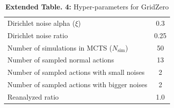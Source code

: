 \begin{table}[h]
\begin{center}
\begin{small}
{\begin{tabular}{lc}
Dirichlet noise alpha ($\xi$) & 0.3 \\
Dirichlet noise ratio & 0.25 \\
Number of simulations in MCTS ($N_{\text{sim}}$) & 50 \\
Number of sampled normal actions & 13 \\
Number of sampled actions with small noises & 2 \\
Number of sampled actions with bigger noises & 2 \\
Reanalyzed ratio & 1.0 \\
\bottomrule
\end{tabular}
}
\end{small}
\end{center}
\captionsetup{labelformat=empty}
    \caption{\textbf{Extended Table. 4:} Hyper-parameters for GridZero}
\end{table}




